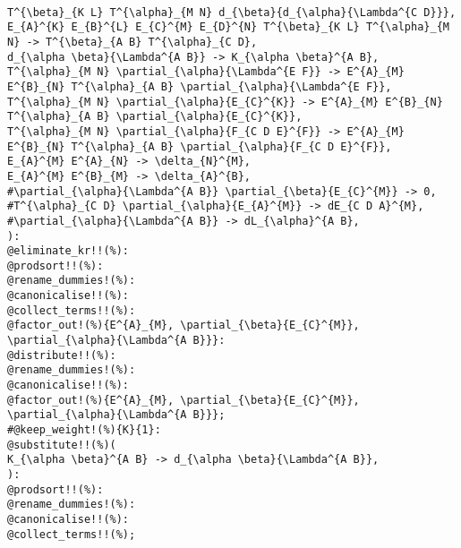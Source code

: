 \documentclass[11pt]{article}
\begin{document}
{\begin{verbatim}
                                                                                                                             T^{\beta}_{K L} T^{\alpha}_{M N} d_{\beta}{d_{\alpha}{\Lambda^{C D}}},
E_{A}^{K} E_{B}^{L} E_{C}^{M} E_{D}^{N} T^{\beta}_{K L} T^{\alpha}_{M N} -> T^{\beta}_{A B} T^{\alpha}_{C D},
d_{\alpha \beta}{\Lambda^{A B}} -> K_{\alpha \beta}^{A B},
T^{\alpha}_{M N} \partial_{\alpha}{\Lambda^{E F}} -> E^{A}_{M} E^{B}_{N} T^{\alpha}_{A B} \partial_{\alpha}{\Lambda^{E F}},
T^{\alpha}_{M N} \partial_{\alpha}{E_{C}^{K}} -> E^{A}_{M} E^{B}_{N} T^{\alpha}_{A B} \partial_{\alpha}{E_{C}^{K}},
T^{\alpha}_{M N} \partial_{\alpha}{F_{C D E}^{F}} -> E^{A}_{M} E^{B}_{N} T^{\alpha}_{A B} \partial_{\alpha}{F_{C D E}^{F}},
E_{A}^{M} E^{A}_{N} -> \delta_{N}^{M},
E_{A}^{M} E^{B}_{M} -> \delta_{A}^{B},
#\partial_{\alpha}{\Lambda^{A B}} \partial_{\beta}{E_{C}^{M}} -> 0,
#T^{\alpha}_{C D} \partial_{\alpha}{E_{A}^{M}} -> dE_{C D A}^{M},
#\partial_{\alpha}{\Lambda^{A B}} -> dL_{\alpha}^{A B},
):
@eliminate_kr!!(%):
@prodsort!!(%):
@rename_dummies!(%):
@canonicalise!!(%):
@collect_terms!!(%):
@factor_out!(%){E^{A}_{M}, \partial_{\beta}{E_{C}^{M}}, \partial_{\alpha}{\Lambda^{A B}}}:
@distribute!!(%):
@rename_dummies!(%):
@canonicalise!!(%):
@factor_out!(%){E^{A}_{M}, \partial_{\beta}{E_{C}^{M}}, \partial_{\alpha}{\Lambda^{A B}}};
#@keep_weight!(%){K}{1}:
@substitute!!(%)(
K_{\alpha \beta}^{A B} -> d_{\alpha \beta}{\Lambda^{A B}},
):
@prodsort!!(%):
@rename_dummies!(%):
@canonicalise!!(%):
@collect_terms!!(%);
\end{verbatim}}
\end{document}
